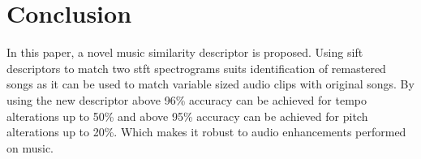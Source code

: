 \section{Conclusion}

In this paper, a novel music similarity descriptor is proposed. Using \gls{sift} descriptors to match 
two \gls{stft} spectrograms suits identification of remastered songs as it can be used to match 
variable sized audio clips with original songs. By using the new descriptor above 96\% accuracy can be 
achieved for tempo alterations up to 50\% and above 95\% accuracy can be achieved for pitch alterations 
up to 20\%. Which makes it robust to audio enhancements performed on music. 